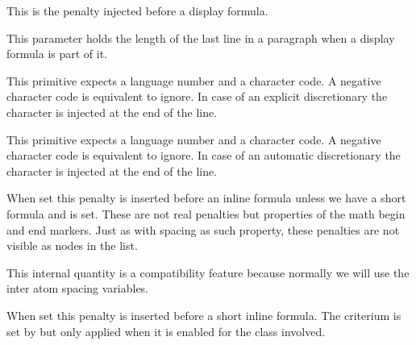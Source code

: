 \startoldprimitive[title={\prm {predisplaypenalty}}]

This is the penalty injected before a display formula.

\stopoldprimitive

\startoldprimitive[title={\prm {predisplaysize}}]

This parameter holds the length of the last line in a paragraph when a display
formula is part of it.

\stopoldprimitive

\startnewprimitive[title={\prm {preexhyphenchar}}]

This primitive expects a language number and a character code. A negative
character code is equivalent to ignore. In case of an explicit discretionary the
character is injected at the end of the line.

\stopnewprimitive

\startnewprimitive[title={\prm {prehyphenchar}}]

This primitive expects a language number and a character code. A negative
character code is equivalent to ignore. In case of an automatic discretionary the
character is injected at the end of the line.

\stopnewprimitive

\startnewprimitive[title={\prm {preinlinepenalty}}]

When set this penalty is inserted before an inline formula unless we have a short
formula and  is set. These are not real penalties but
properties of the math begin and end markers. Just as with spacing as such
property, these penalties are not visible as nodes in the list.

\stopnewprimitive

\startnewprimitive[title={\prm {prerelpenalty}}]

This internal quantity is a compatibility feature because normally we will use
the inter atom spacing variables.

\stopnewprimitive


\startnewprimitive[title={\prm {preshortinlinepenalty}}]

When set this penalty is inserted before a short inline formula. The criterium is
set by  but only applied when it is enabled for
the class involved.

\stopnewprimitive

